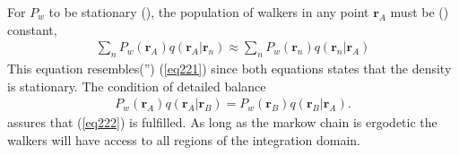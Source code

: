 \documentclass[a4paper,10pt,twocolumn]{article} %
\newcommand{\ts}[1]{\textbf{#1}}
\begin{document}
For $P_w$ to be stationary (), the population of walkers in any point $\ts r_A$ must be () constant,
\begin{align}
	\sum_n P_w(\ts r_A) q(\ts r_A|\ts r_n)  \approx	\sum_n P_w(\ts r_n) q(\ts r_n|\ts r_A) \label{eq222}
\end{align} 
This equation resembles('') (\ref{eq221}) since both equations states that the density is stationary.
The condition of detailed balance
\begin{align}
    P_w(\ts r_A) q(\ts r_A|\ts r_B)  =  P_w(\ts r_B) q(\ts r_B|\ts r_A).\label{detbal}
\end{align}
assures that (\ref{eq222}) is fulfilled. 
As long as the markow chain is ergodetic the walkers will have access to all regions of the integration domain.
\end{document}
